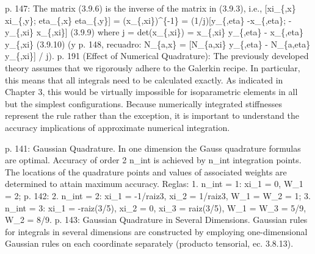 \documentclass[11pt,a4paper]{article}
\newcommand{\campo}[1]{\textcolor{gris}{\footnotesize #1}}
\begin{document}
\begin{pasaje}\footnotesize p. 147: \textquotedbl{}The matrix (3.9.6) is the inverse of the matrix in (3.9.3), i.e., [xi\_\{,x\} xi\_\{,y\}; eta\_\{,x\} eta\_\{,y\}] = (x\_\{,xi\})\textasciicircum{}\{-1\} = (1/j)[y\_\{,eta\} -x\_\{,eta\}; -y\_\{,xi\} x\_\{,xi\}] (3.9.9) where j = det(x\_\{,xi\}) = x\_\{,xi\} y\_\{,eta\} - x\_\{,eta\} y\_\{,xi\} (3.9.10)\textquotedbl{} (y p. 148, recuadro: \textquotedbl{}N\_\{a,x\} = [N\_\{a,xi\} y\_\{,eta\} - N\_\{a,eta\} y\_\{,xi\}] / j\textquotedbl{}). p. 191 (Effect of Numerical Quadrature): \textquotedbl{}The previously developed theory assumes that we rigorously adhere to the Galerkin recipe. In particular, this means that all integrals need to be calculated exactly. As indicated in Chapter 3, this would be virtually impossible for isoparametric elements in all but the simplest configurations. Because numerically integrated stiffnesses represent the rule rather than the exception, it is important to understand the accuracy implications of approximate numerical integration.\textquotedbl{}\end{pasaje}
\vspace{3pt}\noindent{\small\textbf{p.\ 141-142} \quad \campo{La regla de Gauss de m puntos integra exactamente polinomios de grado 2m-1; los puntos son xi = +-1/raiz(3) para 2 puntos y xi = +-raiz(3/5), 0 con pesos 5/9, 8/9, 5/9 para 3 puntos. --- tesis/capitulos/02\_marco\_teorico.tex:242}}\par
\begin{pasaje}\footnotesize p. 141: \textquotedbl{}Gaussian Quadrature. In one dimension the Gauss quadrature formulas are optimal. Accuracy of order 2 n\_int is achieved by n\_int integration points. The locations of the quadrature points and values of associated weights are determined to attain maximum accuracy.\textquotedbl{} Reglas: \textquotedbl{}1. n\_int = 1: xi\_1 = 0, W\_1 = 2\textquotedbl{}; p. 142: \textquotedbl{}2. n\_int = 2: xi\_1 = -1/raiz3, xi\_2 = 1/raiz3, W\_1 = W\_2 = 1\textquotedbl{}; \textquotedbl{}3. n\_int = 3: xi\_1 = -raiz(3/5), xi\_2 = 0, xi\_3 = raiz(3/5), W\_1 = W\_3 = 5/9, W\_2 = 8/9\textquotedbl{}. p. 143: \textquotedbl{}Gaussian Quadrature in Several Dimensions. Gaussian rules for integrals in several dimensions are constructed by employing one-dimensional Gaussian rules on each coordinate separately\textquotedbl{} (producto tensorial, ec. 3.8.13).\end{pasaje}
\vspace{3pt}\noindent{\small\textbf{p.\ 221-222} \quad \campo{EduFEM usa cuadratura 2x2 para Q4 y 3x3 para Q9, ordenes que integran exactamente la rigidez de los respectivos elementos no distorsionados. --- tesis/capitulos/02\_marco\_teorico.tex:242}}\par
\end{document}
